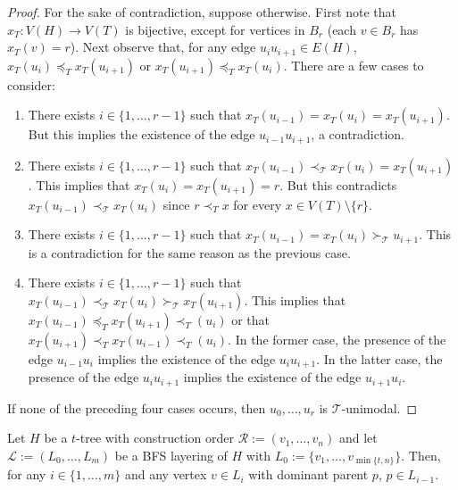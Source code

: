 \documentclass[kpfonts]{patmorin}
\theoremstyle{named}
\begin{document}
\begin{proof}
    For the sake of contradiction, suppose otherwise.  First note that $x_T:V(H)\to V(T)$ is bijective, except for vertices in $B_r$ (each $v\in B_r$ has $x_T(v)=r$).  Next observe that, for any edge $u_iu_{i+1}\in E(H)$, $x_T(u_i)\preceq_T x_T(u_{i+1})$ or $x_T(u_{i+1})\preceq_T x_T(u_{i})$.  There are a few cases to consider:
    \begin{enumerate}
        \item There exists $i\in\{1,\ldots,r-1\}$ such that $x_T(u_{i-1})= x_T(u_i)= x_T(u_{i+1})$.  But this implies the existence of the edge $u_{i-1}u_{i+1}$, a contradiction.

        \item There exists $i\in\{1,\ldots,r-1\}$ such that $x_T(u_{i-1})\prec_\mathcal{T} x_T(u_i)= x_T(u_{i+1})$.  This implies that $x_T(u_{i})=x_T(u_{i+1})=r$.  But this contradicts $x_T(u_{i-1})\prec_\mathcal{T} x_T(u_i)$ since $r\prec_T x$ for every $x\in V(T)\setminus\{r\}$.

        \item There exists $i\in\{1,\ldots,r-1\}$ such that $x_T(u_{i-1})= x_T(u_i)\succ_\mathcal{T} u_{i+1}$.  This is a contradiction for the same reason as the previous case.

        \item There exists $i\in\{1,\ldots,r-1\}$ such that $x_T(u_{i-1}) \prec_\mathcal{T} x_T(u_i)\succ_\mathcal{T} x_T(u_{i+1})$.  This implies that $x_T(u_{i-1})\preceq_T x_T(u_{i+1}) \prec_T(u_{i})$ or that
        $x_T(u_{i+1})\prec_T x_T(u_{i-1}) \prec_T(u_{i})$.  In the former case, the presence of the edge $u_{i-1}u_i$ implies the existence of the edge $u_iu_{i+1}$. In the latter case, the presence of the edge $u_{i}u_{i+1}$ implies the existence of the edge $u_{i+1}u_i$.
    \end{enumerate}
    If none of the preceding four cases occurs, then $u_0,\ldots,u_r$ is $\mathcal{T}$-unimodal.
\end{proof}




\begin{obs}\label{dominant-parent}
    Let $H$ be a $t$-tree with construction order $\mathcal{R}:=(v_1,\ldots,v_n)$ and let $\mathcal{L}:=(L_0,\ldots,L_m)$ be a BFS layering of $H$ with $L_0:=\{v_1,\ldots,v_{\min\{t,n\}}\}$.  Then, for any $i\in\{1,\ldots,m\}$ and any vertex $v\in L_{i}$ with dominant parent $p$, $p\in L_{i-1}$.
\end{obs}
\end{document}
